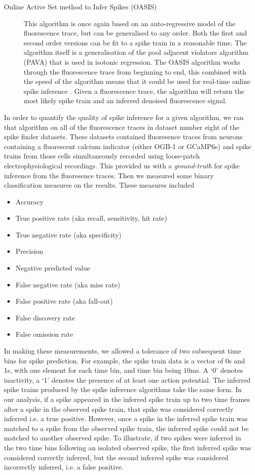 \begin{description}
    \item[Online Active Set method to Infer Spikes (OASIS)] This algorithm is once again based on an auto-regressive model of the fluorescence trace, but can be generalised to any order. Both the first and second order versions can be fit to a spike train in a reasonable time. The algorithm itself is a generalisation of the pool adjacent violators algorithm (PAVA) that is used in isotonic regression. The OASIS algorithm works through the fluorescence trace from beginning to end, this combined with the speed of the algorithm means that it could be used for real-time online spike inference  \parencite{friedrich}. Given a fluorescence trace, the algorithm will return the most likely spike train and an inferred denoised fluorescence signal.
\end{description}
In order to quantify the quality of spike inference for a given algorithm, we ran that algorithm on all of the fluorescence traces in dataset number eight of the spike finder datasets. These datasets contained fluoresence traces from neurons containing a fluorescent calcium indicator (either OGB-1 or GCaMP6s) and spike trains from those cells simultaneously recorded using loose-patch electrophysiological recordings. This provided us with a \textit{ground-truth} for spike inference from the fluoresence traces. Then we measured some binary classification measures on the results. These measures included
\begin{itemize}
    \item Accuracy
    \item True positive rate (aka recall, sensitivity, hit rate)
    \item True negative rate (aka specificity)
    \item Precision
    \item Negative predicted value
    \item False negative rate (aka miss rate)
    \item False positive rate (aka fall-out)
    \item False discovery rate
    \item False omission rate
\end{itemize}
In making these measurements, we allowed a tolerance of two subsequent time bins for spike prediction. For example, the spike train data is a vector of 0s and 1s, with one element for each time bin, and time bin being $10$ms. A `0' denotes inactivity, a `1' denotes the presence of at least one action potential. The inferred spike trains produced by the spike inference algorithms take the same form. In our analysis, if a spike appeared in the inferred spike train up to two time frames after a spike in the observed spike train, that spike was considered correctly inferred i.e. a true positive. However, once a spike in the inferred spike train was matched to a spike from the observed spike train, the inferred spike could not be matched to another observed spike. To illustrate, if two spikes were inferred in the two time bins following an isolated observed spike, the first inferred spike was considered correctly inferred, but the second inferred spike was considered incorrectly inferred, i.e. a false positive.

